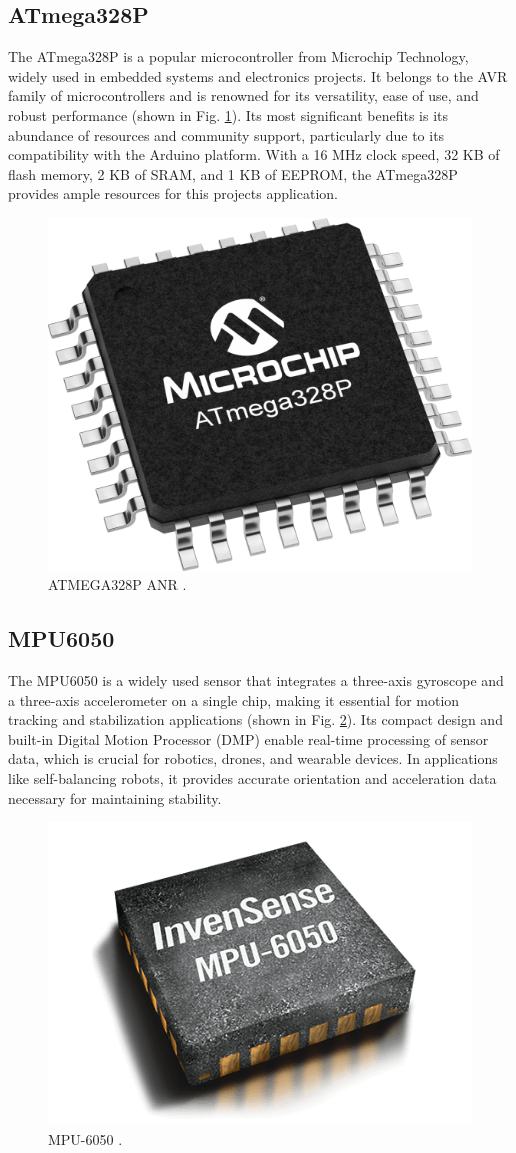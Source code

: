\documentclass{article}
\begin{document}
\subsection{ATmega328P}
The ATmega328P is a popular microcontroller from Microchip Technology, widely used in embedded systems and electronics projects. It belongs to the AVR family of microcontrollers and is renowned for its versatility, ease of use, and robust performance (shown in Fig. \ref{fig:ATmega328p}). Its most significant benefits is its abundance of resources and community support, particularly due to its compatibility with the Arduino platform. With a 16 MHz clock speed, 32 KB of flash memory, 2 KB of SRAM, and 1 KB of EEPROM, the ATmega328P provides ample resources for this projects application. 

\begin{figure}[h]
    \centering
    \includegraphics[width=0.15\linewidth]{assets/ATmega328p.png}
    \caption{ATMEGA328P ANR \cite{atmega_microchip}.}
    \label{fig:ATmega328p}
\end{figure}

\subsection{MPU6050}
The MPU6050 is a widely used sensor that integrates a three-axis gyroscope and a three-axis accelerometer on a single chip, making it essential for motion tracking and stabilization applications (shown in Fig. \ref{fig:mpu-6050}). Its compact design and built-in Digital Motion Processor (DMP) enable real-time processing of sensor data, which is crucial for robotics, drones, and wearable devices.
In applications like self-balancing robots, it provides accurate orientation and acceleration data necessary for maintaining stability. 

\begin{figure}[h]
    \centering
    \includegraphics[width=0.15\linewidth]{assets/mpu-6050.png}
    \caption{MPU-6050 \cite{mpu6050}.}
    \label{fig:mpu-6050}
\end{figure}
\end{document}
